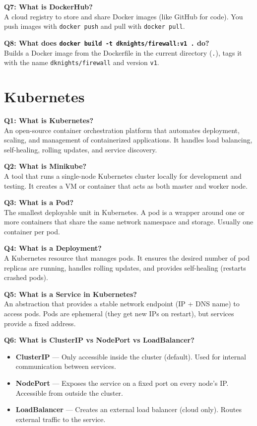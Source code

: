 \documentclass[12pt,a4paper]{article}
\begin{document}
\textbf{Q7: What is DockerHub?}\\
A cloud registry to store and share Docker images (like GitHub for code). You push images with \texttt{docker push} and pull with \texttt{docker pull}.

\textbf{Q8: What does \texttt{docker build -t dknights/firewall:v1 .} do?}\\
Builds a Docker image from the Dockerfile in the current directory (\texttt{.}), tags it with the name \texttt{dknights/firewall} and version \texttt{v1}.

\section{Kubernetes}

\textbf{Q1: What is Kubernetes?}\\
An open-source container orchestration platform that automates deployment, scaling, and management of containerized applications. It handles load balancing, self-healing, rolling updates, and service discovery.

\textbf{Q2: What is Minikube?}\\
A tool that runs a single-node Kubernetes cluster locally for development and testing. It creates a VM or container that acts as both master and worker node.

\textbf{Q3: What is a Pod?}\\
The smallest deployable unit in Kubernetes. A pod is a wrapper around one or more containers that share the same network namespace and storage. Usually one container per pod.

\textbf{Q4: What is a Deployment?}\\
A Kubernetes resource that manages pods. It ensures the desired number of pod replicas are running, handles rolling updates, and provides self-healing (restarts crashed pods).

\textbf{Q5: What is a Service in Kubernetes?}\\
An abstraction that provides a stable network endpoint (IP + DNS name) to access pods. Pods are ephemeral (they get new IPs on restart), but services provide a fixed address.

\textbf{Q6: What is ClusterIP vs NodePort vs LoadBalancer?}
\begin{itemize}[noitemsep]
    \item \textbf{ClusterIP} --- Only accessible inside the cluster (default). Used for internal communication between services.
    \item \textbf{NodePort} --- Exposes the service on a fixed port on every node's IP. Accessible from outside the cluster.
    \item \textbf{LoadBalancer} --- Creates an external load balancer (cloud only). Routes external traffic to the service.
\end{itemize}
\end{document}
